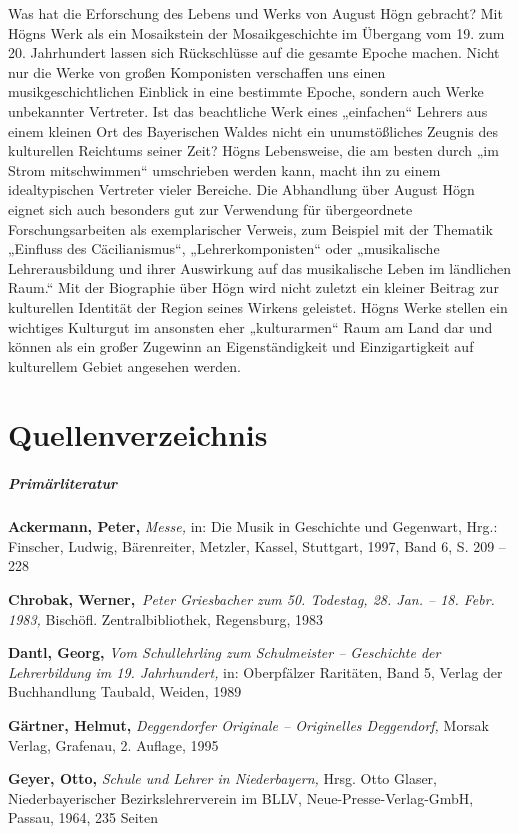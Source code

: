 \documentclass[a4paper]{article}
\begin{document}
Was hat die Erforschung des Lebens und Werks von August Högn gebracht?
Mit Högns Werk als ein Mosaikstein der Mosaikgeschichte im Übergang vom
19. zum 20. Jahrhundert lassen sich Rückschlüsse auf die gesamte Epoche
machen. Nicht nur die Werke von großen Komponisten verschaffen uns
einen musikgeschichtlichen Einblick in eine bestimmte Epoche, sondern
auch Werke unbekannter Vertreter. Ist das beachtliche Werk eines
„einfachen“ Lehrers aus einem kleinen Ort des Bayerischen Waldes nicht
ein unumstößliches Zeugnis des kulturellen Reichtums seiner Zeit? Högns
Lebensweise, die am besten durch „im Strom mitschwimmen“ umschrieben
werden kann, macht ihn zu einem idealtypischen Vertreter vieler
Bereiche. Die Abhandlung über August Högn eignet sich auch besonders
gut zur Verwendung für übergeordnete Forschungsarbeiten als
exemplarischer Verweis, zum Beispiel mit der Thematik „Einfluss des
Cäcilianismus“, „Lehrerkomponisten“ oder „musikalische Lehrerausbildung
und ihrer Auswirkung auf das musikalische Leben im ländlichen Raum.“
Mit der Biographie über Högn wird nicht zuletzt ein kleiner Beitrag zur
kulturellen Identität der Region seines Wirkens geleistet. Högns Werke
stellen ein wichtiges Kulturgut im ansonsten eher „kulturarmen“ Raum am
Land dar und können als ein großer Zugewinn an Eigenständigkeit und
Einzigartigkeit auf kulturellem Gebiet angesehen werden.

\section[Quellenverzeichnis]{Quellenverzeichnis}
\hypertarget{RefHeadingToc100333757}{}\subparagraph[Primärliteratur]{Primärliteratur}
\textbf{Ackermann, Peter,} \textit{Messe,} in: Die Musik in Geschichte
und Gegenwart, Hrg.: Finscher, Ludwig, Bärenreiter, Metzler, Kassel,
Stuttgart, 1997, Band 6, S. 209 – 228

\textbf{Chrobak, Werner,}~\textit{Peter Griesbacher zum 50. Todestag,
28. Jan. – 18. Febr. 1983,} Bischöfl. Zentralbibliothek, Regensburg,
1983

\textbf{Dantl, Georg,} \textit{Vom Schullehrling zum Schulmeister –
Geschichte der Lehrerbildung im 19. Jahrhundert,} in: Oberpfälzer
Raritäten, Band 5, Verlag der Buchhandlung Taubald, Weiden, 1989

\textbf{Gärtner, Helmut,} \textit{Deggendorfer Originale – Originelles
Deggendorf,} Morsak Verlag, Grafenau, 2. Auflage, 1995

\textbf{Geyer, Otto,} \textit{Schule und Lehrer in Niederbayern,} Hrsg.
Otto Glaser, Niederbayerischer Bezirkslehrerverein im BLLV,
Neue-Presse-Verlag-GmbH, Passau, 1964, 235 Seiten
\end{document}
